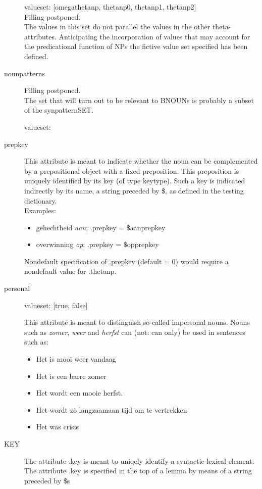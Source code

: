 \begin{description}
valueset: [omegathetanp, thetanp0, thetanp1, thetanp2] \\

Filling postponed.\\

The values in this set do not parallel the values in the other theta-attributes.
Anticipating the incorporation of values that may account for the predicational
function of NPs the fictive value set specified has been defined.\\

\newpage
\item 
[nounpatterns]\mbox{}

Filling postponed. \\

The set that will turn out to be relevant to BNOUNs is probably a subset
of the synpatternSET.

valueset:
\newpage
\item
[prepkey]\mbox{}

This attribute is meant to indicate whether the noun can be complemented
by a prepositional object with a fixed preposition. 
This preposition is uniquely identified by its key (of type keytype).
Such a key is indicated indirectly by its name, a string preceded
by \$, as defined in the testing dictionary.\\

Examples:
\begin{itemize}
  \item 
 gehechtheid {\em aan}; .prepkey = \$aanprepkey
  \item
 overwinning {\em op}; .prepkey = \$opprepkey
\end{itemize}

Nondefault specification of .prepkey
(default = 0) would require a nondefault value for .thetanp.

\newpage
\item 
[personal]\mbox{}

valueset: [true, false]

This attribute is meant to distinguish so-called impersonal nouns. 
Nouns such as {\em zomer}, {\em weer} and {\em herfst} can (not: can only) 
be used in sentences
such as: 
\begin{itemize}
  \item 
Het is mooi weer vandaag
  \item 
Het is een barre zomer
  \item
Het wordt een mooie herfst.
  \item
Het wordt zo langzaamaan tijd om te vertrekken 
  \item
Het was crisis 
\end{itemize}
\newpage
\item 
[KEY]\mbox{}

The attribute .key is meant to uniqely identify a syntactic lexical element.\\

The attribute .key is specified in the top of a lemma by means of a string
preceded by \$s
\end{description}


